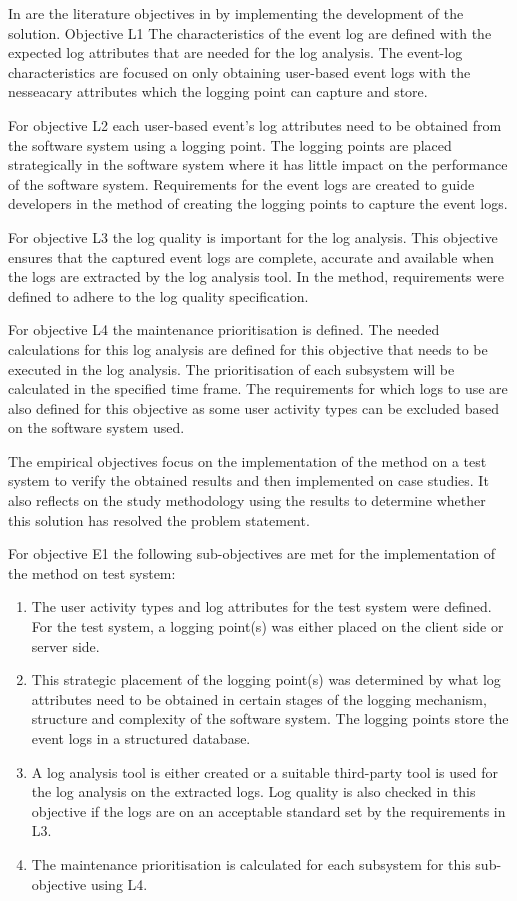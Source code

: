 In  are the literature objectives in  by implementing the development of the solution. Objective L1 The characteristics of the event log are defined with the expected log attributes that are needed for the log analysis. The event-log characteristics are focused on only obtaining user-based event logs with the nesseacary attributes which the logging point can capture and store.\par For objective L2 each user-based event's log attributes need to be obtained from the software system using a logging point. The logging points are placed strategically in the software system where it has little impact on the performance of the software system. Requirements for the event logs are created to guide developers in the method of creating the logging points to capture the event logs.\par For objective L3 the log quality is important for the log analysis. This objective ensures that the captured event logs are complete, accurate and available when the logs are extracted by the log analysis tool. In the method, requirements were defined to adhere to the log quality specification.\par For objective L4 the maintenance prioritisation is defined. The needed calculations for this log analysis are defined for this objective that needs to be executed in the log analysis. The prioritisation of each subsystem will be calculated in the specified time frame. The requirements for which logs to use are also defined for this objective as some user activity types can be excluded based on the software system used.\par The empirical objectives focus on the implementation of the method on a test system to verify the obtained results and then implemented on case studies. It also reflects on the study methodology using the results to determine whether this solution has resolved the problem statement.\par For objective E1 the following sub-objectives are met for the implementation of the method on test system:

\begin{enumerate}
	\item The user activity types and log attributes for the test system were defined. For the test system, a logging point(s) was either placed on the client side or server side.
	\item This strategic placement of the logging point(s) was determined by what log attributes need to be obtained in certain stages of the logging mechanism, structure and complexity of the software system. The logging points store the event logs in a structured database.
	\item A log analysis tool is either created or a suitable third-party tool is used for the log analysis on the extracted logs. Log quality is also checked in this objective if the logs are on an acceptable standard set by the requirements in L3. 
	\item The maintenance prioritisation is calculated for each subsystem for this sub-objective using L4.
\end{enumerate} 

